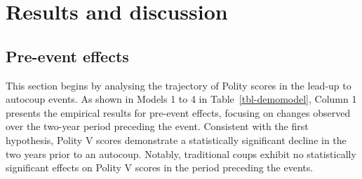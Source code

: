 \documentclass[
  12pt,
]{report}
\begin{document}
\section{Results and discussion}\label{results-and-discussion-1}

\subsection*{Pre-event effects}\label{pre-event-effects}

This section begins by analysing the trajectory of Polity scores in the
lead-up to autocoup events. As shown in Models 1 to 4 in
Table~\ref{tbl-demomodel}, Column 1 presents the empirical results for
pre-event effects, focusing on changes observed over the two-year period
preceding the event. Consistent with the first hypothesis, Polity V
scores demonstrate a statistically significant decline in the two years
prior to an autocoup. Notably, traditional coups exhibit no
statistically significant effects on Polity V scores in the period
preceding the events.
\end{document}
